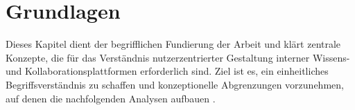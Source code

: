 \chapter{Grundlagen}
\label{ch:02_theoretical-foundations}

Dieses Kapitel dient der begrifflichen Fundierung der Arbeit und klärt zentrale Konzepte, die für das Verständnis nutzerzentrierter Gestaltung interner Wissens- und Kollaborationsplattformen erforderlich sind. Ziel ist es, ein einheitliches Begriffsverständnis zu schaffen und konzeptionelle Abgrenzungen vorzunehmen, auf denen die nachfolgenden Analysen aufbauen \cite{500:ISO9241-210,303:Rosenfeld2015,408:Hassenzahl2010,406:Albers2015}.
\vspace{1em}




